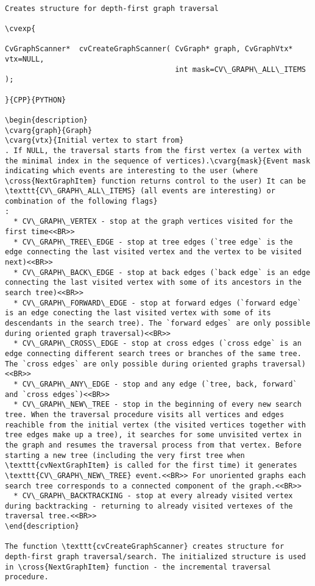 \begin{verbatim}

Creates structure for depth-first graph traversal

\cvexp{

CvGraphScanner*  cvCreateGraphScanner( CvGraph* graph, CvGraphVtx* vtx=NULL,
                                       int mask=CV\_GRAPH\_ALL\_ITEMS );

}{CPP}{PYTHON}

\begin{description}
\cvarg{graph}{Graph}
\cvarg{vtx}{Initial vertex to start from}
. If NULL, the traversal starts from the first vertex (a vertex with the minimal index in the sequence of vertices).\cvarg{mask}{Event mask indicating which events are interesting to the user (where \cross{NextGraphItem} function returns control to the user) It can be \texttt{CV\_GRAPH\_ALL\_ITEMS} (all events are interesting) or combination of the following flags}
:
  * CV\_GRAPH\_VERTEX - stop at the graph vertices visited for the first time<<BR>>
  * CV\_GRAPH\_TREE\_EDGE - stop at tree edges (`tree edge` is the edge connecting the last visited vertex and the vertex to be visited next)<<BR>>
  * CV\_GRAPH\_BACK\_EDGE - stop at back edges (`back edge` is an edge connecting the last visited vertex with some of its ancestors in the search tree)<<BR>>
  * CV\_GRAPH\_FORWARD\_EDGE - stop at forward edges (`forward edge` is an edge conecting the last visited vertex with some of its descendants in the search tree). The `forward edges` are only possible during oriented graph traversal)<<BR>>
  * CV\_GRAPH\_CROSS\_EDGE - stop at cross edges (`cross edge` is an edge connecting different search trees or branches of the same tree. The `cross edges` are only possible during oriented graphs traversal)<<BR>>
  * CV\_GRAPH\_ANY\_EDGE - stop and any edge (`tree, back, forward` and `cross edges`)<<BR>>
  * CV\_GRAPH\_NEW\_TREE - stop in the beginning of every new search tree. When the traversal procedure visits all vertices and edges reachible from the initial vertex (the visited vertices together with tree edges make up a tree), it searches for some unvisited vertex in the graph and resumes the traversal process from that vertex. Before starting a new tree (including the very first tree when \texttt{cvNextGraphItem} is called for the first time) it generates \texttt{CV\_GRAPH\_NEW\_TREE} event.<<BR>> For unoriented graphs each search tree corresponds to a connected component of the graph.<<BR>>
  * CV\_GRAPH\_BACKTRACKING - stop at every already visited vertex during backtracking - returning to already visited vertexes of the traversal tree.<<BR>>
\end{description}

The function \texttt{cvCreateGraphScanner} creates structure for depth-first graph traversal/search. The initialized structure is used in \cross{NextGraphItem} function - the incremental traversal procedure.


\end{verbatim}
